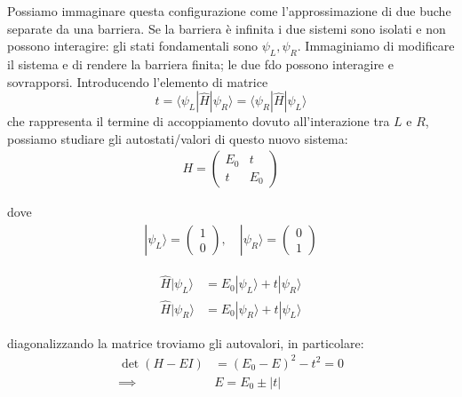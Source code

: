 \noindent Possiamo immaginare questa configurazione come l'approssimazione di due buche separate da una barriera. Se la barriera è infinita i due sistemi sono isolati e non possono interagire: gli stati fondamentali sono $\psi_L, \psi_R$. Immaginiamo di modificare il sistema e di rendere la barriera finita; le due fdo possono interagire e sovrapporsi. Introducendo l'elemento di matrice $$t=\langle\psi_L|\hat H| \psi_R \rangle = \langle\psi_R|\hat H| \psi_L \rangle$$
che rappresenta il termine di accoppiamento dovuto all'interazione tra $L$ e $R$, possiamo studiare gli autostati/valori di questo nuovo sistema:
\begin{align*}
    H = 
    \begin{pmatrix}
        E_0 & t \\
        t & E_0
    \end{pmatrix}
\end{align*}

dove 
\begin{align*}
    |\psi_L\rangle = \begin{pmatrix}
        1\\
        0
    \end{pmatrix}, \quad    
    |\psi_R\rangle = \begin{pmatrix}
        0\\
        1
    \end{pmatrix}    
\end{align*}

\begin{align*}
    \hat H|\psi_L\rangle &=  E_0 |\psi_L\rangle + t|\psi_R\rangle\\
    \hat H|\psi_R\rangle &=  E_0 |\psi_R\rangle + t|\psi_L\rangle
\end{align*}

diagonalizzando la matrice troviamo gli autovalori, in particolare:
\begin{align*}
    \det(H- EI) & =(E_0- E)^2 - t^2 = 0\\
    \implies \quad & E = E_0 \pm |t|
\end{align*}


